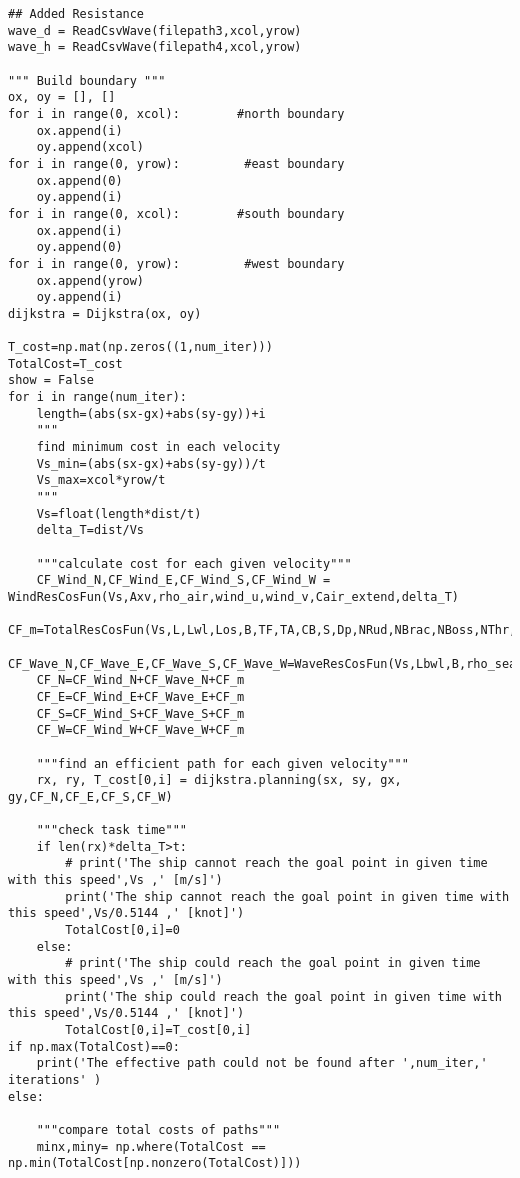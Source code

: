 \begin{lstlisting}[caption=Testing codes (\autoref{TestResults}), label=TestCodes]
## Added Resistance
wave_d = ReadCsvWave(filepath3,xcol,yrow)
wave_h = ReadCsvWave(filepath4,xcol,yrow)

""" Build boundary """
ox, oy = [], []
for i in range(0, xcol):        #north boundary
    ox.append(i)
    oy.append(xcol)
for i in range(0, yrow):         #east boundary
    ox.append(0)
    oy.append(i)
for i in range(0, xcol):        #south boundary
    ox.append(i)
    oy.append(0)
for i in range(0, yrow):         #west boundary
    ox.append(yrow)
    oy.append(i)
dijkstra = Dijkstra(ox, oy)

T_cost=np.mat(np.zeros((1,num_iter)))
TotalCost=T_cost
show = False
for i in range(num_iter):
    length=(abs(sx-gx)+abs(sy-gy))+i
    """ 
    find minimum cost in each velocity
    Vs_min=(abs(sx-gx)+abs(sy-gy))/t
    Vs_max=xcol*yrow/t
    """
    Vs=float(length*dist/t)
    delta_T=dist/Vs

    """calculate cost for each given velocity"""
    CF_Wind_N,CF_Wind_E,CF_Wind_S,CF_Wind_W = WindResCosFun(Vs,Axv,rho_air,wind_u,wind_v,Cair_extend,delta_T)
    CF_m=TotalResCosFun(Vs,L,Lwl,Los,B,TF,TA,CB,S,Dp,NRud,NBrac,NBoss,NThr,rho_sea,nu_sea,g,delta_T)
    CF_Wave_N,CF_Wave_E,CF_Wave_S,CF_Wave_W=WaveResCosFun(Vs,Lbwl,B,rho_sea,wave_d,wave_h,delta_T)
    CF_N=CF_Wind_N+CF_Wave_N+CF_m
    CF_E=CF_Wind_E+CF_Wave_E+CF_m
    CF_S=CF_Wind_S+CF_Wave_S+CF_m
    CF_W=CF_Wind_W+CF_Wave_W+CF_m

    """find an efficient path for each given velocity"""
    rx, ry, T_cost[0,i] = dijkstra.planning(sx, sy, gx, gy,CF_N,CF_E,CF_S,CF_W)

    """check task time"""
    if len(rx)*delta_T>t:
        # print('The ship cannot reach the goal point in given time with this speed',Vs ,' [m/s]')
        print('The ship cannot reach the goal point in given time with this speed',Vs/0.5144 ,' [knot]')
        TotalCost[0,i]=0
    else:
        # print('The ship could reach the goal point in given time with this speed',Vs ,' [m/s]')
        print('The ship could reach the goal point in given time with this speed',Vs/0.5144 ,' [knot]')
        TotalCost[0,i]=T_cost[0,i]
if np.max(TotalCost)==0:
    print('The effective path could not be found after ',num_iter,' iterations' )
else:

    """compare total costs of paths"""
    minx,miny= np.where(TotalCost == np.min(TotalCost[np.nonzero(TotalCost)]))


\end{lstlisting}
